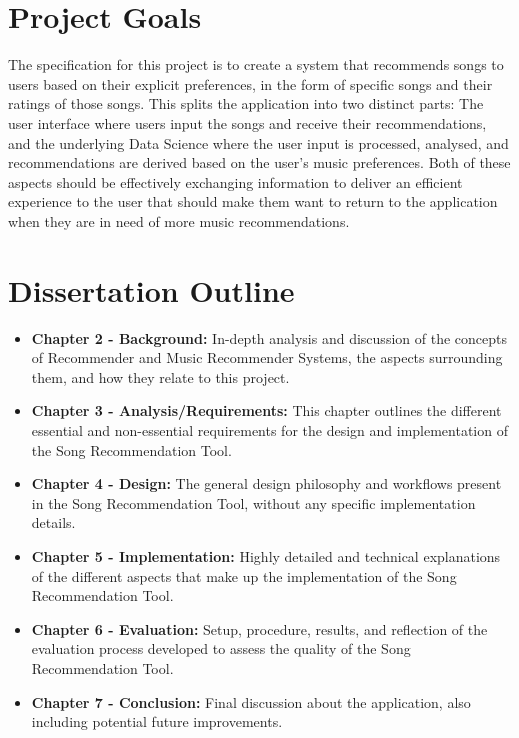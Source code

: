 \documentclass{l4proj}
\begin{document}
\section{Project Goals}
The specification for this project is to create a system that recommends songs to users based on their explicit preferences, in the form of specific songs and their ratings of those songs. This splits the application into two distinct parts: The user interface where users input the songs and receive their recommendations, and the underlying Data Science where the user input is processed, analysed, and recommendations are derived based on the user's music preferences. Both of these aspects should be effectively exchanging information to deliver an efficient experience to the user that should make them want to return to the application when they are in need of more music recommendations.
\section{Dissertation Outline}
\begin{itemize}
    \item \textbf{Chapter 2 - Background:} In-depth analysis and discussion of the concepts of Recommender and Music Recommender Systems, the aspects surrounding them, and how they relate to this project.
    \item \textbf{Chapter 3 - Analysis/Requirements:} This chapter outlines the different essential and non-essential requirements for the design and implementation of the Song Recommendation Tool.
    \item \textbf{Chapter 4 - Design:} The general design philosophy and workflows present in the Song Recommendation Tool, without any specific implementation details.
    \item \textbf{Chapter 5 - Implementation:} Highly detailed and technical explanations of the different aspects that make up the implementation of the Song Recommendation Tool.
    \item \textbf{Chapter 6 - Evaluation:} Setup, procedure, results, and reflection of the evaluation process developed to assess the quality of the Song Recommendation Tool.
    \item \textbf{Chapter 7 - Conclusion:} Final discussion about the application, also including potential future improvements.
\end{itemize}

\end{document}
